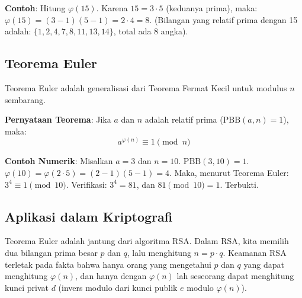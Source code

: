 \textbf{Contoh}:
Hitung $\varphi(15)$. Karena $15 = 3 \cdot 5$ (keduanya prima), maka:
$\varphi(15) = (3-1)(5-1) = 2 \cdot 4 = 8$.
(Bilangan yang relatif prima dengan 15 adalah: $\{1, 2, 4, 7, 8, 11, 13, 14\}$, total ada 8 angka).

\subsection{Teorema Euler}

Teorema Euler adalah generalisasi dari Teorema Fermat Kecil untuk modulus $n$ sembarang.

\textbf{Pernyataan Teorema}:
Jika $a$ dan $n$ adalah relatif prima ($\text{PBB}(a, n) = 1$), maka:
\[ a^{\varphi(n)} \equiv 1 \pmod{n} \]

\textbf{Contoh Numerik}:
Misalkan $a = 3$ dan $n = 10$.
$\text{PBB}(3, 10) = 1$.
$\varphi(10) = \varphi(2 \cdot 5) = (2-1)(5-1) = 4$.
Maka, menurut Teorema Euler: $3^4 \equiv 1 \pmod{10}$.
Verifikasi: $3^4 = 81$, dan $81 \pmod{10} = 1$. Terbukti.

\subsection{Aplikasi dalam Kriptografi}

Teorema Euler adalah jantung dari algoritma RSA. Dalam RSA, kita memilih dua bilangan prima besar $p$ dan $q$, lalu menghitung $n = p \cdot q$. Keamanan RSA terletak pada fakta bahwa hanya orang yang mengetahui $p$ dan $q$ yang dapat menghitung $\varphi(n)$, dan hanya dengan $\varphi(n)$ lah seseorang dapat menghitung kunci privat $d$ (invers modulo dari kunci publik $e$ modulo $\varphi(n)$).
